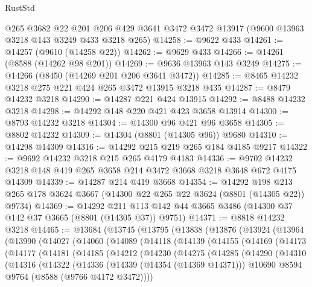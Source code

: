 \begin{lexlean}{RustStd}
\begin{coremodule}
    @265
    @3682
    @22
    @201
    @206
    @429
    @3641
    @3472
    @3472
    @13917
    (@9600 @13963 @3218 @143 @3249 @433 @3218 @265)
@14258 := @9622 @433
@14261 := @14257 (@9610 (@14258 @22))
@14262 := @9629 @433
@14266 := @14261 (@8588 (@14262 @98 @201))
@14269 := @9636 @13963 @143 @3249
@14275 := @14266 (@8450 (@14269 @201 @206 @3641 @3472))
@14285 := @8465 @14232 @3218 @275 @221 @424 @265 @3472 @13915 @3218 @435
@14287 := @8479 @14232 @3218
@14290 := @14287 @221 @424 @13915
@14292 := @8488 @14232 @3218
@14298 := @14292 @148 @220 @421 @423 @3658 @13914
@14300 := @8793 @14232 @3218
@14304 := @14300 @96 @421 @96 @3658
@14305 := @8802 @14232
@14309 := @14304 (@8801 (@14305 @96)) @9680
@14310 := @14298 @14309
@14316 := @14292 @215 @219 @265 @184 @4185 @9217
@14322 := @9692 @14232 @3218 @215 @265 @4179 @4183
@14336 := @9702 @14232 @3218 @148 @419 @265 @3658 @214 @3472 @3668 @3218 @3648 @672 @4175 @14309
@14339 := @14287 @214 @419 @3668
@14354 := @14292
    @198
    @213
    @265
    @178
    @3624
    @3667
    (@14300 @22 @265 @22 @3624 (@8801 (@14305 @22)) @9734)
@14369 := @14292
    @211
    @113
    @142
    @44
    @3665
    @3486
    (@14300 @37 @142 @37 @3665 (@8801 (@14305 @37)) @9751)
@14371 := @8818 @14232 @3218
@14465 := @13684
    (@13745
      (@13795
        (@13838
          (@13876
            (@13924
              (@13964
                (@13990
                  (@14027
                    (@14060
                      (@14089
                        (@14118
                          (@14139
                            (@14155
                              (@14169
                                (@14173
                                  (@14177
                                    (@14181
                                      (@14185
                                        (@14212
                                          (@14230
                                            (@14275
                                              (@14285
                                                (@14290
                                                  (@14310
                                                    (@14316
                                                      (@14322
                                                        (@14336
                                                          (@14339 (@14354 (@14369 @14371)))
                                                          @10690
                                                          @8594
                                                          @9764
                                                          (@8588 (@9766 @4172 @3472))))

\end{coremodule}
\end{lexlean}
